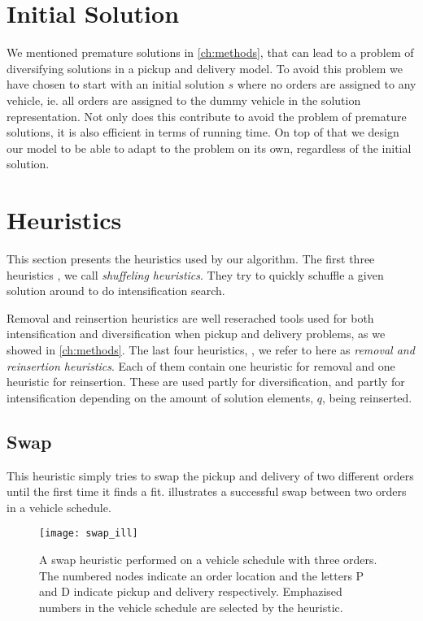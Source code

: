 \documentclass[../main.tex]{subfiles}
\begin{document}
\section{Initial Solution}
\label{sec:init}
We mentioned premature solutions in \cref{ch:methods}, that can lead to a problem of diversifying solutions in a pickup and delivery model. 
To avoid this problem we have chosen to start with an initial solution $s$ where no orders are assigned to any vehicle, ie. all orders are assigned to the dummy vehicle in the solution representation.  
Not only does this contribute to avoid the problem of premature solutions, it is also efficient in terms of running time. On top of that we design our model to be able to adapt to the problem on its own, regardless of the initial solution. 

\section{Heuristics}
\label{sec:heur}
This section presents the heuristics used by our algorithm.
The first three heuristics , we call \textit{shuffeling heuristics}. They try to quickly schuffle a given solution around to do intensification search. \par
Removal and reinsertion heuristics are well reserached tools used for both intensification and diversification when pickup and delivery problems, as we showed in \cref{ch:methods}. 
The last four heuristics, , we refer to here as \textit{removal and reinsertion heuristics}. Each of them contain one heuristic for removal and one heuristic for reinsertion.
These are used partly for diversification, and partly for intensification depending on the amount of solution elements, $q$, being reinserted.  

\subsection{Swap}
\label{sec:swap}
This heuristic simply tries to swap the pickup and delivery of two different orders until the first time it finds a fit. 
 illustrates a successful swap between two orders in a vehicle schedule. 

\begin{figure}                                                                    
    \centering                                                                                     
    \texttt{[image: swap\_ill]}                                     
    \caption{A swap heuristic performed on a vehicle schedule with three orders. The numbered nodes indicate an order location and the letters P and D indicate pickup and delivery respectively. Emphazised numbers in the vehicle schedule are selected by the heuristic.}
    \label{fig:swap}
\end{figure}
\end{document}

